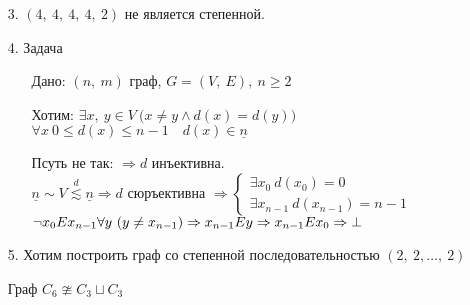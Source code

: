 \documentclass[12pt, letterpaper, twoside]{article}
\begin{document}
        \begin{enumerate}
            \item[3.] $(4,\ 4,\ 4,\ 4,\ 2)$ не является степенной.
            \item[4.] Задача
            \begin{enumerate}
                \item[Дано:] $(n,\ m)$ граф, $G = (V,\ E),\ n\geq 2$
                \item[Хотим:] $\exists x,\ y\in V\ \big(x\neq y \wedge d(x) = d(y)\big)$\\
                $\forall x\ 0 \leq d(x) \leq n - 1\quad d(x)\in \underline{n}$\\
                \item[Псуть не так:] $\Rightarrow d$ инъективна.\\
                $\underline{n}\sim V\overset{d}{\lesssim} \underline{n}\Rightarrow d$ сюръективна $\Rightarrow \begin{cases}\exists x_0\ d(x_0) = 0 \\ \exists x_{n - 1}\ d(x_{n - 1}) = n - 1\end{cases}$\\
                $\neg x_0 E x_{n - 1}\\
                \forall y\ (y \neq x_{n - 1})\Rightarrow x_{n - 1}Ey\Rightarrow x_{n - 1}Ex_0\Rightarrow \bot$
            \end{enumerate}
            \item[5.] Хотим построить граф со степенной последовательностью $(2,\ 2,\dots,\ 2)$\\
            Граф $C_6\ncong C_3 \sqcup C_3$
\end{enumerate}
\end{document}
